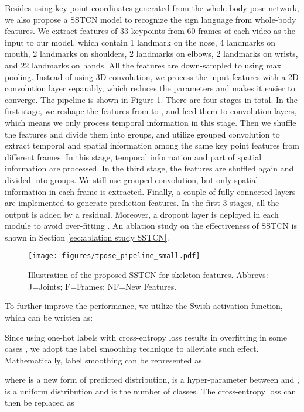 \documentclass[final]{cvpr}
\begin{document}
Besides using key point coordinates generated from the whole-body pose network, we also propose a SSTCN model to recognize the sign language from whole-body features. We extract features of 33 keypoints from 60 frames of each video as the input to our model, which contain 1 landmark on the nose, 4 landmarks on mouth, 2 landmarks on shoulders, 2 landmarks on elbows, 2 landmarks on wrists, and 22 landmarks on hands. All the features are down-sampled to  using max pooling. Instead of using 3D convolution, we process the input features with a 2D convolution layer separably, which reduces the parameters and makes it easier to converge. The pipeline is shown in Figure \ref{fig:tpose}. There are four stages in total. In the first stage, we reshape the features from  to , and feed them to  convolution layers, which means we only process temporal information in this stage. 
Then we shuffle the features and divide them into  groups, and utilize grouped  convolution to extract temporal and spatial information among the same key point features from different frames. In this stage, temporal information and part of spatial information are processed. In the third stage, the features are shuffled again and divided into  groups. We still use grouped  convolution, but only spatial information in each frame is extracted. Finally, a couple of  fully connected layers are implemented to generate prediction features. In the first 3 stages, all the output is added by a residual. Moreover, a dropout layer is deployed in each module to avoid over-fitting \cite{dropout}. An ablation study on the effectiveness of SSTCN is shown in Section \ref{sec:ablation study SSTCN}. 
\begin{figure}[t]
  \centering
  \texttt{[image: figures/tpose\_pipeline\_small.pdf]}
  \caption{Illustration of the proposed SSTCN for skeleton features. Abbrevs: J=Joints; F=Frames; NF=New Features.}
  \label{fig:tpose}
\end{figure}
To further improve the performance, we utilize the Swish \cite{swish} activation function, which can be written as:


Since using one-hot labels with cross-entropy loss results in overfitting in some cases \cite{ren2015faster}, we adopt the label smoothing technique to alleviate such effect. Mathematically, label smoothing can be represented as 

where  is a new form of predicted distribution,  is a hyper-parameter between  and ,  is a uniform distribution and  is the number of classes. The cross-entropy loss can then be replaced as
\end{document}
